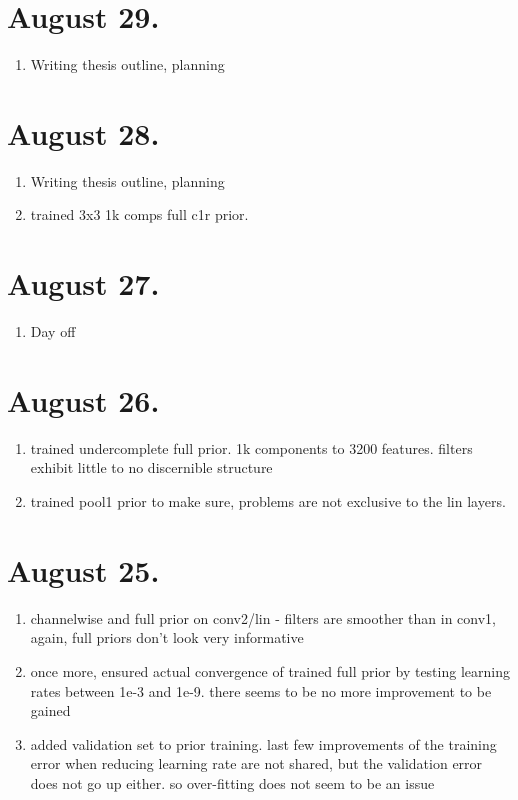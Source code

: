 \documentclass{article}
\begin{document}
\section{August 29.}
\begin{enumerate}
	\item Writing thesis outline, planning
\end{enumerate}

\section{August 28.}

\begin{enumerate}
	\item Writing thesis outline, planning
	\item trained 3x3 1k comps full c1r prior.
\end{enumerate}



\section{August 27.}

\begin{enumerate}
	\item Day off
\end{enumerate}

\section{August 26.}

\begin{enumerate}
	\item trained undercomplete full prior. 1k components to 3200 features. filters exhibit little to no discernible structure
	\item trained pool1 prior to make sure, problems are not exclusive to the lin layers.
\end{enumerate}


\section{August 25.}

\begin{enumerate}
	\item channelwise and full prior on conv2/lin - filters are smoother than in conv1, again, full priors don't look very informative
	\item once more, ensured actual convergence of trained full prior by testing learning rates between 1e-3 and 1e-9. there seems to be no more improvement to be gained
	\item added validation set to prior training. last few improvements of the training error when reducing learning rate are not shared, but the validation error does not go up either. so over-fitting does not seem to be an issue
\end{enumerate}
\end{document}
